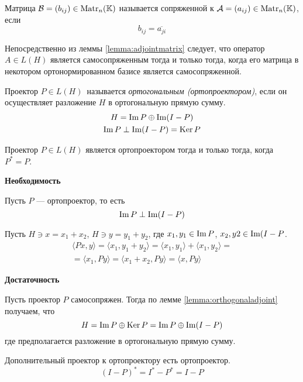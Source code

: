 \begin{definition}
    Матрица $\mathcal{B} = (b_{ij}) \in \mathrm{Matr}_{n}({\mathbb{K}})$ называется сопряженной к
    $\mathcal{A} = (a_{ij}) \in \mathrm{Matr}_{n}({\mathbb{K}})$, если
    \[ b_{ij} = \overline{a_{ji}} \]
\end{definition}

Непосредственно из леммы \ref{lemma:adjointmatrix} следует, что оператор $A\in
L(H)$ является самосопряженным тогда и только тогда, когда его матрица в
некотором ортонормированном базисе является самосопряженной.

\begin{definition}
    Проектор $P\in L(H)$\, называется \emph{ортогональным (ортопроектором)}, если
    он осуществляет разложение $H$ в ортогональную прямую сумму.
    \begin{gather*}
        H = \operatorname{Im} P \oplus \operatorname{Im} (I - P) \\
        \operatorname{Im} P \perp \operatorname{Im} (I - P) = \operatorname{Ker} P
    \end{gather*}
\end{definition}

\begin{lemma}
    Проектор $P\in L(H)$ является ортопроектором тогда и только тогда, когда
    $P^* = P$.    
\end{lemma}

\begin{proofbreak}
    \dindent \textbf{Необходимость}

    Пусть $P$ — ортопроектор, то есть
    \[ \operatorname{Im} P \perp \operatorname{Im} (I - P) \]

    Пусть $H \ni x = x_1 + x_2$, $H \ni y = y_1 + y_2$, где $x_1, y_1 \in \operatorname{Im}
    P$, $x_2, y2 \in \operatorname{Im} (I - P$.
    \begin{multline*}
        \langle Px, y\rangle = \langle x_1, y_1 + y_2 \rangle = 
        \langle x_1, y_1 \rangle + \langle x_1, y_2 \rangle =\\= 
        \langle x_1, Py \rangle = \langle x_1 + x_2, Py
        \rangle = \langle x, Py \rangle
    \end{multline*}

    \textbf{Достаточность}

    Пусть проектор $P$ самосопряжен. Тогда по лемме
    \ref{lemma:orthogonaladjoint} получаем, что 
    \[ H = \operatorname{Im} P \oplus \operatorname{Ker} P = \operatorname{Im} P \oplus \operatorname{Im} (I - P) \]
    где предполагается разложение в ортогональную прямую сумму.
\end{proofbreak}

\begin{corollaryle}
    Дополнительный проектор \hspace{0.1em} к ортопроектору есть ортопроектор.
    \[ (I - P)^* = I^* - P^* = I - P \]
\end{corollaryle}

